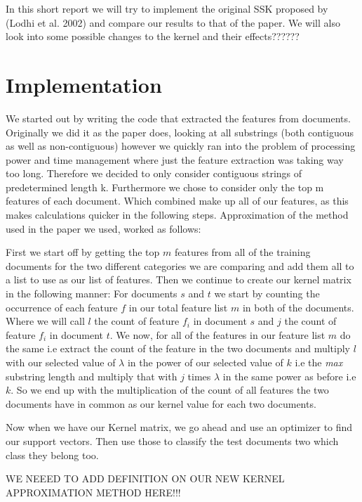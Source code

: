 \documentclass{article}
\theoremstyle{definition}
\begin{document}
In this short report we will try to implement the original SSK proposed by (Lodhi et al. 2002) and compare our results to that of the paper. We will also look into some possible changes to the kernel and their effects??????

\section{Implementation}

We started out by writing the code that extracted the features from documents. Originally we did it as the paper does, looking at all substrings (both contiguous as well as non-contiguous) however we quickly ran into the problem of processing power and time management where just the feature extraction was taking way too long. Therefore we decided to only consider contiguous strings of predetermined length k. Furthermore we chose to consider only the top m  features of each document. Which combined make up all of our features, as this makes calculations quicker in the following steps.
Approximation of the method used in the paper we used, worked as follows:

First we start off by getting the top $m$ features from all of the training documents for the two different categories we are comparing and add them all to a list to use as our list of features.
Then we continue to create our kernel matrix in the following manner:
For documents $s$ and $t$ we start by counting the occurrence of each feature $f$ in our total feature list $m$ in both of the documents. Where we will call $l$ the count of feature $f_i$ in document $s$ and $j$ the count of feature $f_i$ in document $t$.
We now, for all of the features in our feature list $m$ do the same i.e extract the count of the feature in the two documents and multiply $l$ with our selected value of $\lambda$ in the power of our selected value of $k$ i.e the \textit{max} substring length and multiply that with $j$ times $\lambda$ in the same power as before i.e $k$. So we end up with the multiplication of the count of all features the two documents have in common as our kernel value for each two documents.

Now when we have our Kernel matrix, we go ahead and use an optimizer to find our support vectors. Then use those to classify the test documents two which class they belong too.


WE NEEED TO ADD DEFINITION ON OUR NEW KERNEL APPROXIMATION METHOD HERE!!!

\newpage
\end{document}
